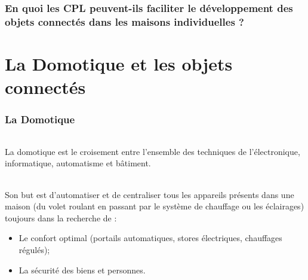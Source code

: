     \section*{En quoi les CPL peuvent-ils faciliter le développement des objets connectés dans les maisons individuelles ?}


\part{La Domotique et les objets connectés}
    \section{La Domotique}
        \paragraph{}
La domotique est le croisement entre l’ensemble des techniques de l’électronique, informatique, automatisme et bâtiment.
        \paragraph{}
Son but est d’automatiser et de centraliser tous les appareils présents dans une maison
(du volet roulant en passant par le système de chauffage ou les éclairages) toujours dans la recherche de :
            \begin{itemize}
                \item Le confort optimal (portails automatiques, stores électriques, chauffages régulés);
                \item La sécurité des biens et personnes.
            \end{itemize}
